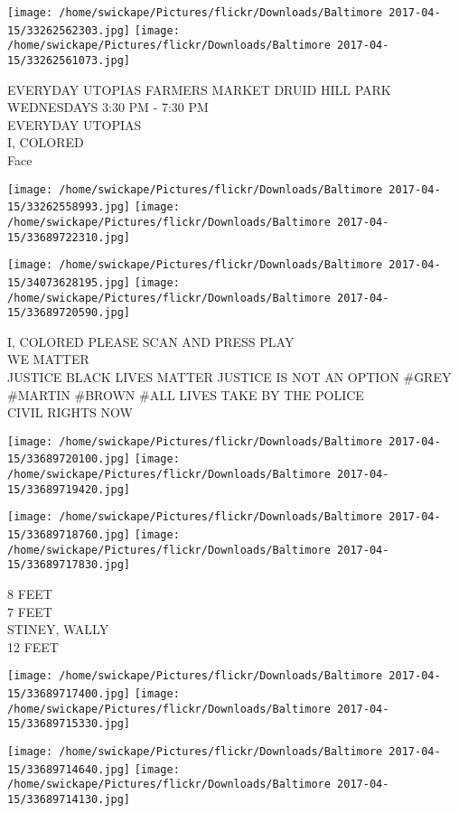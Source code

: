 \documentclass[10pt,letterpaper]{article}
\begin{document}
\texttt{[image: /home/swickape/Pictures/flickr/Downloads/Baltimore 2017-04-15/33262562303.jpg]}
\texttt{[image: /home/swickape/Pictures/flickr/Downloads/Baltimore 2017-04-15/33262561073.jpg]}

EVERYDAY UTOPIAS FARMERS MARKET DRUID HILL PARK WEDNESDAYS 3:30 PM {-} 7:30 PM\\
EVERYDAY UTOPIAS\\
I, COLORED\\
Face
\pagebreak

\texttt{[image: /home/swickape/Pictures/flickr/Downloads/Baltimore 2017-04-15/33262558993.jpg]}
\texttt{[image: /home/swickape/Pictures/flickr/Downloads/Baltimore 2017-04-15/33689722310.jpg]}

\texttt{[image: /home/swickape/Pictures/flickr/Downloads/Baltimore 2017-04-15/34073628195.jpg]}
\texttt{[image: /home/swickape/Pictures/flickr/Downloads/Baltimore 2017-04-15/33689720590.jpg]}

I, COLORED PLEASE SCAN AND PRESS PLAY\\
WE MATTER\\
JUSTICE BLACK LIVES MATTER JUSTICE IS NOT AN OPTION \#GREY \#MARTIN \#BROWN \#ALL LIVES TAKE BY THE POLICE\\
CIVIL RIGHTS NOW
\pagebreak

\texttt{[image: /home/swickape/Pictures/flickr/Downloads/Baltimore 2017-04-15/33689720100.jpg]}
\texttt{[image: /home/swickape/Pictures/flickr/Downloads/Baltimore 2017-04-15/33689719420.jpg]}

\texttt{[image: /home/swickape/Pictures/flickr/Downloads/Baltimore 2017-04-15/33689718760.jpg]}
\texttt{[image: /home/swickape/Pictures/flickr/Downloads/Baltimore 2017-04-15/33689717830.jpg]}

8 FEET\\
7 FEET\\
STINEY, WALLY\\
12 FEET
\pagebreak

\texttt{[image: /home/swickape/Pictures/flickr/Downloads/Baltimore 2017-04-15/33689717400.jpg]}
\texttt{[image: /home/swickape/Pictures/flickr/Downloads/Baltimore 2017-04-15/33689715330.jpg]}

\texttt{[image: /home/swickape/Pictures/flickr/Downloads/Baltimore 2017-04-15/33689714640.jpg]}
\texttt{[image: /home/swickape/Pictures/flickr/Downloads/Baltimore 2017-04-15/33689714130.jpg]}
\end{document}
